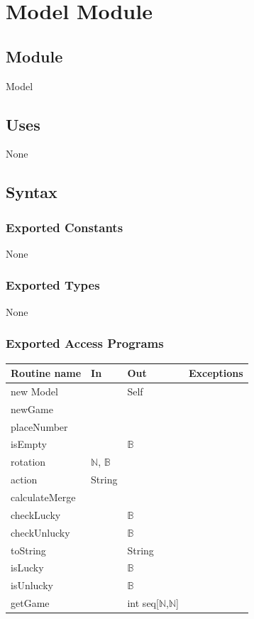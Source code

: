 \documentclass[12pt]{article}
\begin{document}
\newpage


\section* {Model Module}

\subsection*{Module}

Model

\subsection* {Uses}

None

\subsection* {Syntax}

\subsubsection* {Exported Constants}

None

\subsubsection* {Exported Types}

None

\subsubsection* {Exported Access Programs}

\begin{tabular}{| l | l | l | p{5cm} |}
\hline
\textbf{Routine name} & \textbf{In} & \textbf{Out} & \textbf{Exceptions}\\
\hline
new Model & & Self & \\
\hline
\hline
newGame & & & \\
\hline
\hline
placeNumber & & & \\
\hline
\hline
isEmpty & & $\mathbb{B}$ & \\
\hline
\hline
rotation & $\mathbb{N}$, $\mathbb{B}$ & & \\
\hline
\hline
action & String & & \\
\hline
\hline
calculateMerge & & & \\
\hline
\hline
checkLucky & & $\mathbb{B}$ & \\
\hline
\hline
checkUnlucky & & $\mathbb{B}$ & \\
\hline
\hline
toString & & String & \\
\hline
\hline
isLucky & & $\mathbb{B}$ & \\
\hline
\hline
isUnlucky & & $\mathbb{B}$ & \\
\hline
\hline
getGame & & int seq[$\mathbb{N}$,$\mathbb{N}$] & \\
\hline
\end{tabular}
\end{document}
